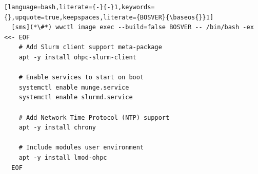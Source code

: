 \begin{lstlisting}[language=bash,literate={-}{-}1,keywords={},upquote=true,keepspaces,literate={BOSVER}{\baseos{}}1]
  [sms](*\#*) wwctl image exec --build=false BOSVER -- /bin/bash -ex <<- EOF
    # Add Slurm client support meta-package
    apt -y install ohpc-slurm-client

    # Enable services to start on boot
    systemctl enable munge.service
    systemctl enable slurmd.service

    # Add Network Time Protocol (NTP) support
    apt -y install chrony

    # Include modules user environment
    apt -y install lmod-ohpc
  EOF
\end{lstlisting}
